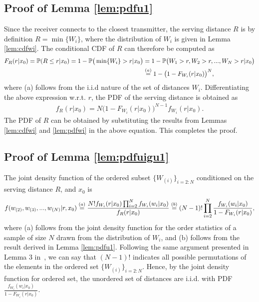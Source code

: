 \documentclass[journal,draftclsnofoot,onecolumn,12pt]{IEEEtran}
\begin{document}
\subsection{Proof of Lemma \ref{lem:pdfu1}}\label{app:pdfu1}
Since the receiver connects to the closest transmitter, the serving distance $R$ is by definition $R= \min\{W_i\} $, where the distribution of $W_i$ is given in Lemma \ref{lem:cdfwi}. The conditional CDF of $R$ can therefore be computed as 
\begin{align}\notag
F_{R}(r|x_0) = \P(R \leq r | x_0) = 1 - \P \big( \min\{W_i\} > r|x_0 \big) &= 1-\P \big(W_1 > r, W_2 > r, ... , W_{N} > r |x_0 \big) \\ 
&\stackrel{(a)}{=} 1-\big( 1 - F_{W_i}(r|x_0) \big)^{N},
\end{align}
where (a) follows from the i.i.d nature of the set of distances ${W_i}$.
Differentiating the above expression w.r.t. $r$, the PDF of the serving distance is obtained as
\begin{align}
f_{R}(r|x_0) =  N\big( 1 - F_{W_i}(r|x_0) \big)^{N-1}f_{W_i}(r|x_0).
\end{align}
The PDF of $R$ can be obtained by substituting the results from Lemmas \ref{lem:cdfwi} and \ref{lem:pdfwi} in the above equation. This completes the proof.
\subsection{Proof of Lemma \ref{lem:pdfuigu1}}\label{app:pdfuigu1}
The joint density function of the ordered subset $\{W_{(i)}\}_{i=2:N}$ conditioned on the serving distance $R$, and $x_0$ is 
\begin{align}\notag
f(w_{(2)}, w_{(3)}, ... , w_{(N)} | r,  x_0) \stackrel{(a)}{=} \frac{N! f_{W_{i}}(r|x_0) \prod_{i=2}^{N}f_{W_i}(w_i|x_0)}{f_{R}(r | x_0)} \stackrel{(b)}{=} (N-1)! \prod_{i=2}^{N}\frac{f_{W_i}(w_i|x_0)}{1-F_{W_{i}}(r | x_0)} ,
\end{align}
where (a) follows from the joint density function for the order statistics of a sample of size $N$ drawn from the distribution of $W_i$, and (b) follows from the result derived in Lemma \ref{lem:pdfu1}. Following the same argument presented in Lemma 3 in~\cite{mehrnazbpp}, we can say that $(N-1)!$ indicates all possible permutations of the elements in the ordered set $\{W_{(i)}\}_{i=2:N}$. Hence, by the joint density function for ordered set, the unordered set of distances are i.i.d. with PDF $\frac{f_{W_i}(w_i|x_0)}{1-F_{W_{i}}(r | x_0)}$.
\end{document}

